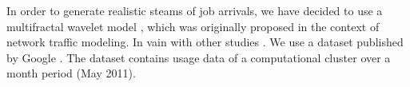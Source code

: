 In order to generate realistic steams of job arrivals, we have decided to use a
multifractal wavelet model \cite{riedi1999}, which was originally proposed in
the context of network traffic modeling. In vain with other studies
\cite{nikitovic2004}. We use a dataset published by Google \cite{google}. The
dataset contains usage data of a computational cluster over a month period (May
2011).

